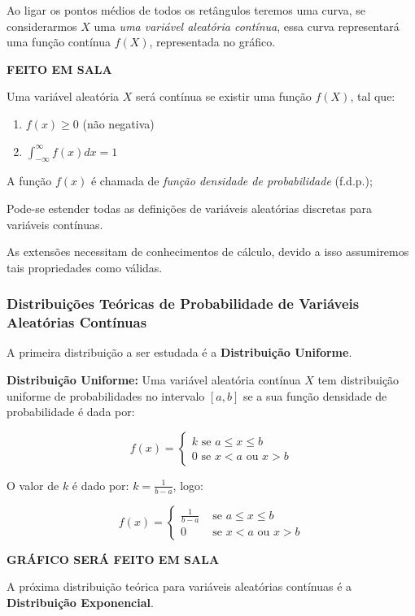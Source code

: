 \documentclass[oneside,a4paper,12pt]{article}
\begin{document}
Ao ligar os pontos médios de todos os retângulos teremos uma curva, se considerarmos $X$ uma \emph{uma variável aleatória contínua}, essa curva representará uma função contínua $f(X)$, representada no gráfico.

{\bf FEITO EM SALA}

Uma variável aleatória $X$ será contínua se existir uma função $f(X)$, tal que:
\begin{enumerate}
	\item $f(x) \geq 0 $ (não negativa)
	\item $\displaystyle \int_{-\infty}^{\infty}f(x)dx = 1$
\end{enumerate}

A função $f(x)$ é chamada de {\it função densidade de probabilidade} (f.d.p.);

Pode-se estender todas as definições de variáveis aleatórias discretas para variáveis contínuas.

As extensões necessitam de conhecimentos de cálculo, devido a isso assumiremos tais propriedades como válidas.

\subsubsection{Distribuições Teóricas de Probabilidade de Variáveis Aleatórias Contínuas}

A primeira distribuição a ser estudada é a {\bf Distribuição Uniforme}.

{\bf Distribuição Uniforme:} Uma variável aleatória contínua $X$ tem distribuição uniforme de probabilidades no intervalo $[a,b]$ se a sua função densidade de probabilidade é dada por:

$$
f(x) = 
\begin{cases}
k \text{ se } a \leq x \leq b \\
0 \text{ se } x < a \text{ ou } x > b
\end{cases}
$$

O valor de $k$ é dado por: $k = \displaystyle \frac{1}{b-a}$, logo:

$$
f(x) = 
\begin{cases}
 \displaystyle \frac{1}{b-a} & \text{ se } a \leq x \leq b \\
0 & \text{ se } x < a \text{ ou } x > b
\end{cases}
$$

{\bf GRÁFICO SERÁ FEITO EM SALA}

A próxima distribuição teórica para variáveis aleatórias contínuas é a {\bf Distribuição Exponencial}.
\end{document}
